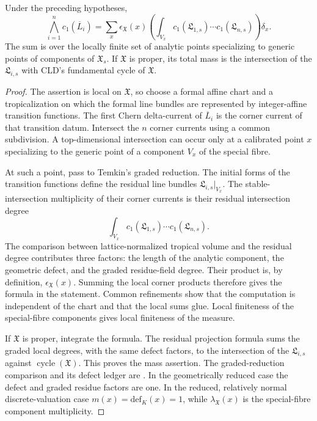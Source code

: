 \begin{theorem}
\label{thm:cld-formal-intersection}
Under the preceding hypotheses,
\[
 \bigwedge_{i=1}^n c_1(\overline L_i)
   =\sum_x \epsilon_{\mathfrak X}(x)
       \left(\int_{V_x}
          c_1(\mathfrak L_{1,s})\cdots
          c_1(\mathfrak L_{n,s})\right)\delta_x.
\]
The sum is over the locally finite set of analytic points specializing to
generic points of components of $\mathfrak X_s$.  If $\mathfrak X$ is
proper, its total mass is the intersection of the $\mathfrak L_{i,s}$
with CLD's fundamental cycle of $\mathfrak X$.
\end{theorem}
\begin{proof}
The assertion is local on $\mathfrak X$, so choose a formal affine chart and
a tropicalization on which the formal line bundles are represented by
integer-affine transition functions.  The first Chern delta-current of
$\overline L_i$ is the corner current of that transition datum.  Intersect
the $n$ corner currents using a common subdivision.  A top-dimensional
intersection can occur only at a calibrated point $x$ specializing to the
generic point of a component $V_x$ of the special fibre.

At such a point, pass to Temkin's graded reduction.  The initial forms of
the transition functions define the residual line bundles
$\mathfrak L_{i,s}|_{V_x}$.  The stable-intersection multiplicity of their
corner currents is their residual intersection degree
\[
             \int_{V_x}c_1(\mathfrak L_{1,s})\cdots
                            c_1(\mathfrak L_{n,s}).
\]
The comparison between lattice-normalized tropical volume and the residual
degree contributes three factors: the length of the analytic
component, the geometric defect, and the graded residue-field degree.  Their
product is, by definition, $\epsilon_{\mathfrak X}(x)$.  Summing the local
corner products therefore gives the formula in the statement.  Common
refinements show that the computation is independent of the chart and that
the local sums glue.  Local finiteness of the special-fibre components gives
local finiteness of the measure.

If $\mathfrak X$ is proper, integrate the formula.  The residual projection
formula sums the graded local degrees, with the same defect factors, to the
intersection of the $\mathfrak L_{i,s}$ against
$\operatorname{cycle}(\mathfrak X)$.  This proves the mass assertion.
The graded-reduction
comparison and its defect ledger are
\cite[Theorem~18.5.5]{CLD25}.  In the geometrically reduced case the defect
and graded residue factors are one.  In the reduced, relatively normal
discrete-valuation case $m(x)=\mathrm{def}_K(x)=1$, while
$\lambda_{\mathfrak X}(x)$ is the special-fibre component multiplicity.
\end{proof}

